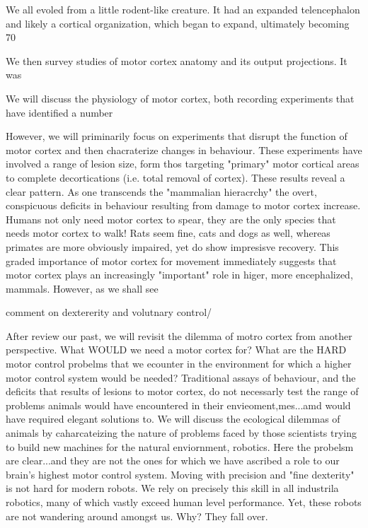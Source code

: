 We all evoled from a little rodent-like creature. It had an expanded telencephalon and likely a cortical organization, which began to expand, ultimately becoming 70%

We then survey studies of motor cortex anatomy and its output projections. It was 

We will discuss the physiology of motor cortex, both recording experiments that have identified a number

However, we will priminarily focus on experiments that disrupt the function of motor cortex and then chacraterize changes in behaviour. These experiments have involved a range of lesion size, form thos targeting "primary" motor cortical areas to complete decortications (i.e. total removal of cortex). These results reveal a clear pattern. As one transcends the "mammalian hieracrchy" the overt, conspicuous deficits in behaviour resulting from damage to motor cortex increase. Humans not only need motor cortex to spear, they are the only species that needs motor cortex to walk! Rats seem fine, cats and dogs as well, whereas primates are more obviously impaired, yet do show impresisve recovery. This graded importance of motor cortex for movement immediately suggests that motor cortex plays an increasingly "important" role in higer, more encephalized, mammals. However, as we shall see

comment on dextererity and volutnary control/


After review our past, we will revisit the dilemma of motro cortex from another perspective. What WOULD we need a motor cortex for? What are the HARD motor control probelms that we ecounter in the environment for which a higher motor control system would be needed? Traditional assays of behaviour, and the deficits that results of lesions to motor cortex, do not necessarly test the range of problems animals would have encountered in their envieoment,mes...amd would have required elegant solutions to. We will discuss the ecological dilemmas of animals by caharcateizing the nature of problems faced by those scientists trying to build new machines for the natural enviornment, robotics. Here the probelsm are clear...and they are not the ones for which we have ascribed a role to our brain's highest motor control system. Moving with precision and "fine dexterity" is not hard for modern robots. We rely on precisely this skill in all industrila robotics, many of which vastly exceed human level performance. Yet, these robots are not wandering around amongst us. Why? They fall over.

